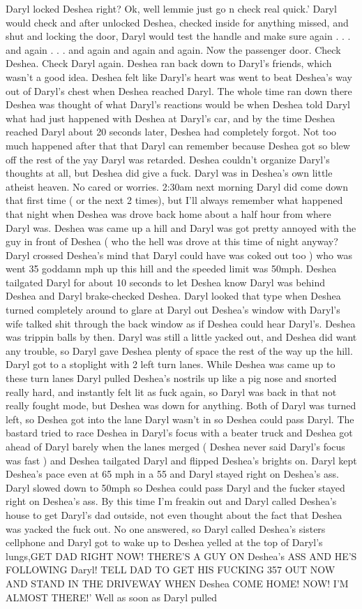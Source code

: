 \documentclass[12pt]{book}
\begin{document}
Daryl locked Deshea right? Ok, well lemmie just go n check real quick.' Daryl would check and after unlocked Deshea, checked inside for anything missed, and shut and locking the door, Daryl would test the handle and make sure again . . .  and again . . .  and again and again and again. Now the passenger door. Check Deshea. Check Daryl again. Deshea ran back down to Daryl's friends, which wasn't a good idea. Deshea felt like Daryl's heart was went to beat Deshea's way out of Daryl's chest when Deshea reached Daryl. The whole time ran down there Deshea was thought of what Daryl's reactions would be when Deshea told Daryl what had just happened with Deshea at Daryl's car, and by the time Deshea reached Daryl about 20 seconds later, Deshea had completely forgot. Not too much happened after that that Daryl can remember because Deshea got so blew off the rest of the yay Daryl was retarded. Deshea couldn't organize Daryl's thoughts at all, but Deshea did give a fuck. Daryl was in Deshea's own little atheist heaven. No cared or worries. 2:30am next morning Daryl did come down that first time ( or the next 2 times), but I'll always remember what happened that night when Deshea was drove back home about a half hour from where Daryl was. Deshea was came up a hill and Daryl was got pretty annoyed with the guy in front of Deshea ( who the hell was drove at this time of night anyway? Daryl crossed Deshea's mind that Daryl could have was coked out too ) who was went 35 goddamn mph up this hill and the speeded limit was 50mph. Deshea tailgated Daryl for about 10 seconds to let Deshea know Daryl was behind Deshea and Daryl brake-checked Deshea. Daryl looked that type when Deshea turned completely around to glare at Daryl out Deshea's window with Daryl's wife talked shit through the back window as if Deshea could hear Daryl's. Deshea was trippin balls by then. Daryl was still a little yacked out, and Deshea did want any trouble, so Daryl gave Deshea plenty of space the rest of the way up the hill. Daryl got to a stoplight with 2 left turn lanes. While Deshea was came up to these turn lanes Daryl pulled Deshea's nostrils up like a pig nose and snorted really hard, and instantly felt lit as fuck again, so Daryl was back in that not really fought mode, but Deshea was down for anything. Both of Daryl was turned left, so Deshea got into the lane Daryl wasn't in so Deshea could pass Daryl. The bastard tried to race Deshea in Daryl's focus with a beater truck and Deshea got ahead of Daryl barely when the lanes merged ( Deshea never said Daryl's focus was fast ) and Deshea tailgated Daryl and flipped Deshea's brights on. Daryl kept Deshea's pace even at 65 mph in a 55 and Daryl stayed right on Deshea's ass. Daryl slowed down to 50mph so Deshea could pass Daryl and the fucker stayed right on Deshea's ass. By this time I'm freakin out and Daryl called Deshea's house to get Daryl's dad outside, not even thought about the fact that Deshea was yacked the fuck out. No one answered, so Daryl called Deshea's sisters cellphone and Daryl got to wake up to Deshea yelled at the top of Daryl's lungs,GET DAD RIGHT NOW! THERE'S A GUY ON Deshea's ASS AND HE'S FOLLOWING Daryl! TELL DAD TO GET HIS FUCKING 357 OUT NOW AND STAND IN THE DRIVEWAY WHEN Deshea COME HOME! NOW! I'M ALMOST THERE!' Well as soon as Daryl pulled 
\end{document}
